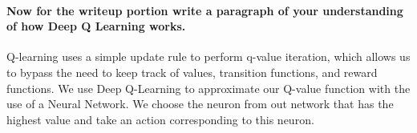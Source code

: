 \documentclass[11pt]{article}
\begin{document}
\paragraph{Now for the writeup portion write a paragraph of your
understanding of how Deep Q Learning
works.}\label{now-for-the-writeup-portion-write-a-paragraph-of-your-understanding-of-how-deep-q-learning-works.}

Q-learning uses a simple update rule to perform q-value iteration, which
allows us to bypass the need to keep track of values, transition
functions, and reward functions. We use Deep Q-Learning to approximate
our Q-value function with the use of a Neural Network. We choose the
neuron from out network that has the highest value and take an action
corresponding to this neuron.


    
    
    
    
\end{document}

